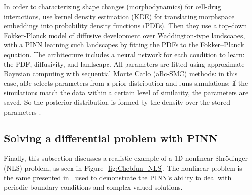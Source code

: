 \documentclass[pdflatex,sn-basic]{sn-jnl}%
\theoremstyle{thmstyleone}%
\theoremstyle{thmstyletwo}%
\theoremstyle{thmstylethree}%
\begin{document}
In order to characterizing shape changes (morphodynamics) for cell-drug interactions, \cite{Cav2021_PhysicsInformedDeep_MosCMS} use kernel density estimation (KDE) for translating morphspace embeddings into probability density functions (PDFs). Then they use  a top-down Fokker-Planck model of diffusive development over Waddington-type landscapes, with a PINN learning such landscapes by fitting the PDFs to the Fokker–Planck equation.
The architecture includes a neural network for each condition to learn: the PDF, diffusivity, and landscape.
All parameters are fitted using approximate Bayesian computing with sequential Monte Carlo (aBc-SMC) methods: in this case, aBc selects parameters from a prior distribution and runs simulations; if the simulations match the data within a certain level of similarity, the parameters are saved.
So the posterior distribution is formed by the density over the stored parameters  \citep{Cav2021_PhysicsInformedDeep_MosCMS}.



\subsection{Solving a differential problem with PINN}\label{sec:Schr_example}

Finally, this subsection discusses a realistic example of a 1D nonlinear Shr\"{o}dinger (NLS) problem, as seen in Figure~\ref{fig:Chebfun_NLS}.
The nonlinear problem is the same presented in \cite{Rai2018_DeepHiddenPhysics_Rai, Rai2017_PhysicsInformedDeep1_PerRPK}, used to demonstrate the PINN’s ability to deal with periodic boundary conditions and complex-valued solutions.
\end{document}
